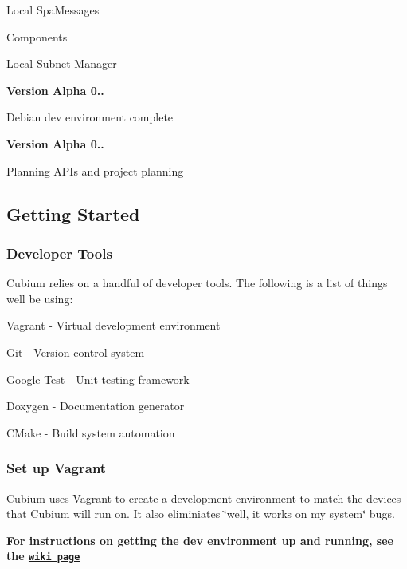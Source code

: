 \begin{DoxyItemize}
\begin{DoxyItemize}
\begin{DoxyItemize}
\item Local Spa\+Messages
\item Components
\item Local Subnet Manager
\end{DoxyItemize}
\end{DoxyItemize}
\item {\bfseries Version Alpha 0..}
\begin{DoxyItemize}
\item Debian dev environment complete
\end{DoxyItemize}
\item {\bfseries Version Alpha 0..}
\begin{DoxyItemize}
\item Planning A\+PI\textquotesingle{}s and project planning
\end{DoxyItemize}
\end{DoxyItemize}

\subsection*{Getting Started}

\subsubsection*{Developer Tools}

Cubium relies on a handful of developer tools. The following is a list of things we\textquotesingle{}ll be using\+:
\begin{DoxyItemize}
\item Vagrant -\/ Virtual development environment
\item Git -\/ Version control system
\item Google Test -\/ Unit testing framework
\item Doxygen -\/ Documentation generator
\item C\+Make -\/ Build system automation
\end{DoxyItemize}

\subsubsection*{Set up Vagrant}

Cubium uses Vagrant to create a development environment to match the devices that Cubium will run on. It also eliminiates \char`\"{}well, it works on my system\char`\"{} bugs.

{\bfseries For instructions on getting the dev environment up and running, see the \href{https://github.com/Cubium/Cubium/wiki/Setting-up-the-Cubium-Dev-Environment}{\tt wiki page}}


